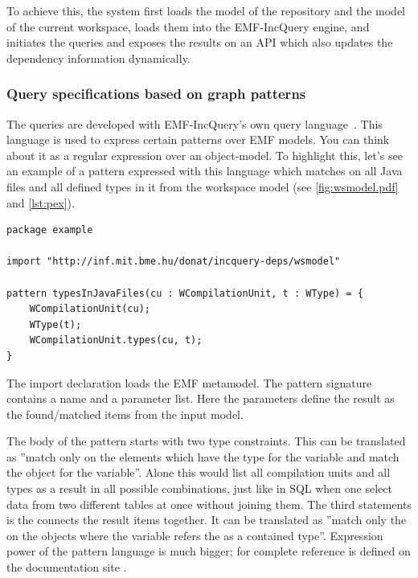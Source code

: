 To achieve this, the system first loads the model of the repository and the 
model of the current workspace, loads them into the EMF-IncQuery engine, 
and initiates the queries and exposes the results on an API which also updates
the dependency information dynamically.
 
\subsubsection{Query specifications based on graph
patterns}\label{sect:patternqueries} The queries are developed with
EMF-IncQuery's own query language~\cite{icmt2011}. This language is used to
express certain patterns over EMF models. You can think about it as a regular
expression over an object-model.
To highlight this, let's see an example of a pattern expressed with this
language which matches on all Java files and all defined types in it from the
workspace model (see \autoref{fig:wsmodel.pdf} and \autoref{lst:pex}).
\begin{lstlisting}[caption=EMF-IncQuery pattern example, label=lst:pex]
package example

import "http://inf.mit.bme.hu/donat/incquery-deps/wsmodel"

pattern typesInJavaFiles(cu : WCompilationUnit, t : WType) = {
	WCompilationUnit(cu);
	WType(t);
	WCompilationUnit.types(cu, t);
}
\end{lstlisting}

The import declaration loads the EMF metamodel. The pattern signature
contains a name and a parameter list. Here the parameters define the result as
the found/matched items from the input model. 

The body of the pattern starts with two type constraints. This can be translated
as ''match only on the elements which have the  type for
the  variable and match the  object for the 
variable''. Alone this would list all compilation units and all types as a
result in all possible combinations, just like in SQL when one select data from
two different tables at once without joining them. The third statements is the
connects the result items together. It can be translated as ''match only the on
the objects  where the  variable refers the  as a contained
type''. Expression power of the pattern language is much bigger; for complete
reference is defined on the documentation site \cite{EMFIncQuery}.

